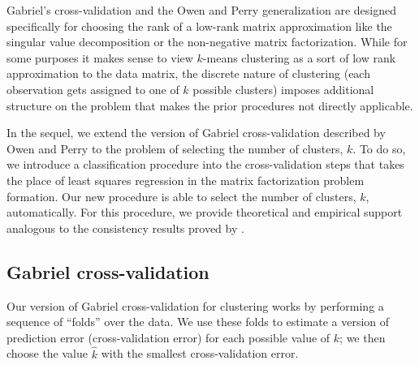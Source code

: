 \documentclass[12pt]{article}
\begin{document}

Gabriel's cross-validation and the Owen and Perry generalization are designed
specifically for choosing the rank of a low-rank matrix approximation like the
singular value decomposition or the non-negative matrix factorization. While
for some purposes it makes sense to view $k$-means clustering as a sort of low
rank approximation to the data matrix, the discrete nature of clustering (each
observation gets assigned to one of $k$ possible clusters) imposes additional
structure on the problem that makes the prior procedures not directly
applicable.

In the sequel, we extend the version of Gabriel cross-validation described by
Owen and Perry to the problem of selecting the number of clusters, $k$. To do
so, we introduce a classification procedure into the cross-validation steps
that takes the place of least squares regression in the matrix factorization
problem formation. Our new procedure is able to select the number of clusters,
$k$, automatically. For this procedure, we provide theoretical and empirical
support analogous to the consistency results proved by \citet{owen2009bi}.


\subsection{Gabriel cross-validation}
\label{sec:gabriel-cv-algorithm}


Our version of Gabriel cross-validation for clustering works by performing a
sequence of ``folds'' over the data. We use these folds to estimate a version
of prediction error (cross-validation error) for each possible value of $k$;
we then choose the value $\hat k$ with the smallest cross-validation error.
\end{document}
